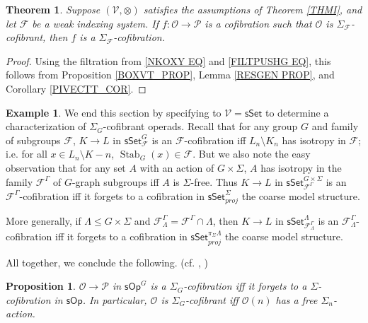 \documentclass[a4paper,10pt
,draft
]{article}%
\numberwithin{equation}{section}
\numberwithin{figure}{section}
\newtheorem{theorem}[equation]{Theorem}%
\newtheorem{proposition}[equation]{Proposition}%
\theoremstyle{definition} %
\newtheorem{example}[equation]{Example}%
\newcommand{\sSet}{\ensuremath{\mathsf{sSet}}}%
\newcommand{\sOp}{\ensuremath{\mathsf{sOp}}}%
\DeclareMathOperator{\Stab}{Stab}
\newcommand{\F}{\ensuremath{\mathcal F}}
\newcommand{\V}{\ensuremath{\mathcal V}}
\renewcommand{\O}{\ensuremath{\mathcal O}}
\renewcommand{\P}{\ensuremath{\mathcal P}}
\newcommand{\1}{\ensuremath{\mathbbm 1}}%
\begin{document}
\begin{theorem}
      \label{SIGMAG_COF_THM}
      Suppose $(\V, \otimes)$ satisfies the assumptions of Theorem \ref{THMI},
      and let $\F$ be a weak indexing system.
      If $f \colon \O \to \P$ is a cofibration such that $\O$ is $\Sigma_\F$-cofibrant, then $f$ is a $\Sigma_\F$-cofibration.
\end{theorem}
\begin{proof}
      Using the filtration from \eqref{NKOXY EQ} and \eqref{FILTPUSHG EQ}, %
      this follows from Proposition \ref{BOXVT_PROP}, Lemma \ref{RESGEN PROP}, and Corollary \ref{PIVECTT_COR}.
\end{proof}





\begin{example}
      We end this section by specifying to $\V = \sSet$ to determine a characterization of $\Sigma_G$-cofibrant operads.
      Recall that for any group $G$ and family of subgroups $\F$,
      $K \to L$ in $\sSet^{G}_\F$ is an $\F$-cofibration iff $L_n \setminus K_n$ has isotropy in $\F$; i.e. for all $x \in L_n \setminus K-n$, $\Stab_{G}(x) \in \F$.
      But we also note the easy observation that for any set $A$ with an action of $G \times \Sigma$,
      $A$ has isotropy in the family $\F^\Gamma$ of $G$-graph subgroups
      iff
      $A$ is $\Sigma$-free.
      Thus $K \to L$ in $\sSet^{G \times \Sigma}_{\F^\Gamma}$ is an $\F^\Gamma$-cofibration
      iff
      it forgets to a cofibration in $\sSet^\Sigma_{proj}$ the coarse model structure.
      
      More generally, if $\Lambda \leq G \times \Sigma$ and $\F^\Gamma_{\Lambda} = \F^\Gamma \cap \Lambda$,
      then $K \to L$ in $\sSet^{\Lambda}_{\F^\Gamma_\Lambda}$ is an $\F^\Gamma_\Lambda$-cofibration
      iff
      it forgets to a cofibration in $\sSet^{\pi_{\Sigma}\Lambda}_{proj}$ the coarse model structure.
      
      All together, we conclude the following. (cf. \cite[Remark 6.7]{Per18}, \cite[discussion before Thm. 2.31]{BP_edss})
\end{example}

\begin{proposition}
      \label{SGS_COF_PROP}
      $\O \to \P$ in $\sOp^G$ is a $\Sigma_G$-cofibration iff it forgets to a $\Sigma$-cofibration in $\sOp$.
      In particular, $\O$ is $\Sigma_G$-cofibrant iff $\O(n)$ has a free $\Sigma_n$-action.
\end{proposition}
\end{document}
